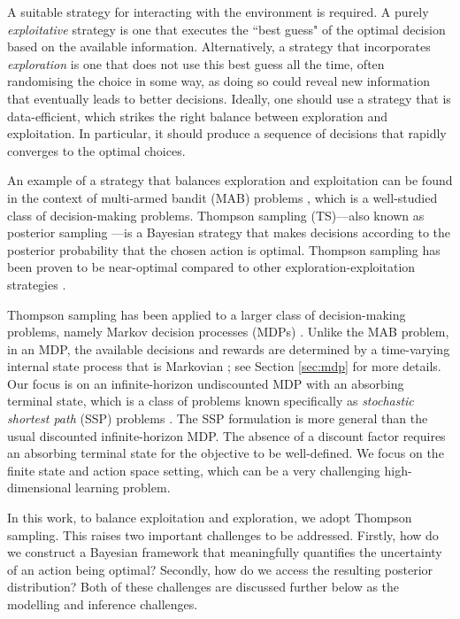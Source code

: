 \documentclass{amsart}
\begin{document}
A suitable strategy for interacting with the environment 
is required. A purely {\it exploitative} strategy is one that executes the ``best guess" of the optimal decision based on the available information.  Alternatively, a strategy that incorporates \emph{exploration} is one that does not use this best guess all the time, often randomising the choice  in some way, as doing so could reveal new information that eventually leads to better decisions. Ideally, one should use a strategy  that is data-efficient, which strikes the right balance between exploration and exploitation. In particular, it should produce a sequence of decisions that rapidly converges to the optimal choices.

An example of a strategy that balances exploration and exploitation can be found in the context of multi-armed bandit (MAB) problems \citep{tstutorial,suttonbartobook}, which is a well-studied class of decision-making problems. Thompson sampling (TS)---also known as posterior sampling \citep{ts1933,tstutorial}---is a Bayesian strategy that makes decisions according to the posterior probability that the chosen action is optimal. Thompson sampling has been proven to be near-optimal compared to other exploration-exploitation strategies \citep{tsagrawal2013contextual,tsshidong2018contextualbayesregret}. 

Thompson sampling has been applied to a larger class of decision-making problems, namely Markov decision processes (MDPs) \citep{tsdeardenbayesq,tsstren,randomisedvaluefunction}. Unlike the MAB problem, in an MDP, the available decisions and rewards are determined by a time-varying internal state process that is Markovian \citep{putermanrl,suttonbartobook}; see Section \ref{sec:mdp} for more details. Our focus is on an infinite-horizon undiscounted MDP with an absorbing terminal state, which is a class of problems known specifically as \emph{stochastic shortest path} (SSP) problems \citep{bertseka1991,putermanrl}. The SSP formulation is more general than the usual discounted infinite-horizon MDP. The absence of a discount factor requires an absorbing terminal state for the objective to be well-defined. We focus on the finite state and action space setting, which can be a very challenging high-dimensional learning problem. 

In this work, to balance exploitation and exploration,  we adopt Thompson sampling. This raises two important challenges to be addressed. Firstly, how do we construct a Bayesian framework that meaningfully quantifies the uncertainty of an action being optimal? Secondly, how do we access the resulting posterior distribution? Both of these challenges are discussed further below as the modelling and inference challenges.
\end{document}
